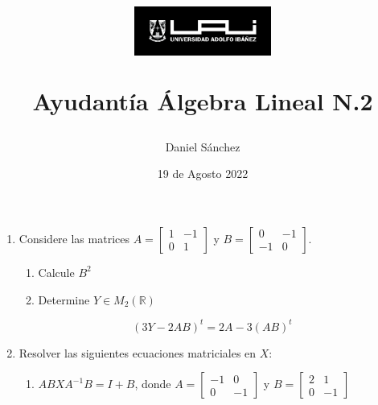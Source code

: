 \documentclass[12pt]{article}
\begin{document}
\title{
    \begin{figure}[ht]
        \centering
        \includegraphics[width = 0.4\textwidth, ]{../../logo-uai.jpg}\\
    \end{figure}
    Ayudant\'ia \'Algebra Lineal N.2}
\date{19 de Agosto 2022}
\author{Daniel S\'anchez}
\maketitle

\begin{enumerate}
    \item Considere las matrices
          $A=
              \begin{bmatrix}
                  1 & -1 \\
                  0 & 1
              \end{bmatrix}$
          y
          $B=
              \begin{bmatrix}
                  0  & -1 \\
                  -1 & 0
              \end{bmatrix}$.
          \begin{enumerate}
              \item Calcule $B^2$
              \item Determine $Y \in M_2(\mathbb{R})$
          \end{enumerate}
          $$ (3Y-2AB)^t=2A-3(AB)^t$$
          
          
    \item Resolver las siguientes ecuaciones matriciales en $X$:
          \begin{enumerate}
              \item $ABXA^{-1}B=I+B$, donde $A=
                        \begin{bmatrix}
                            -1 & 0  \\
                            0  & -1
                        \end{bmatrix}$
                    y
                    $B=
                        \begin{bmatrix}
                            2 & 1  \\
                            0 & -1
                        \end{bmatrix}$
                    

\end{enumerate}
\end{enumerate}
\end{document}
